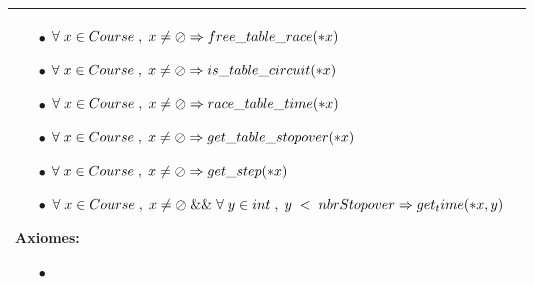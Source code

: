 \documentclass[a4paper, 11pt, oneside]{article}
\begin{document}
\begin{tabular}{|p{17cm}|c}
\begin{itemize}
						\item[$\bullet$] $\forall \hspace{1mm} x \in Course \hspace{1mm} , \hspace{1mm} x \neq \oslash \Rightarrow free\_table\_race(*x)$
						\item[$\bullet$] $\forall \hspace{1mm} x \in Course \hspace{1mm} , \hspace{1mm} x \neq \oslash \Rightarrow is\_table\_circuit(*x)$
						\item[$\bullet$] $\forall \hspace{1mm} x \in Course \hspace{1mm} , \hspace{1mm} x \neq \oslash \Rightarrow race\_table\_time(*x)$
						\item[$\bullet$] $\forall \hspace{1mm} x \in Course \hspace{1mm} , \hspace{1mm} x \neq \oslash \Rightarrow get\_table\_stopover(*x)$
						\item[$\bullet$] $\forall \hspace{1mm} x \in Course \hspace{1mm} , \hspace{1mm} x \neq \oslash \Rightarrow get\_step(*x)$
						\item[$\bullet$] $\forall \hspace{1mm} x \in Course \hspace{1mm} , \hspace{1mm} x \neq \oslash  \hspace{1mm} \&\& \hspace{1mm} \forall \hspace{1mm} y \in int \hspace{1mm} , \hspace{1mm} y \hspace{1mm} < \hspace{1mm} nbrStopover \Rightarrow get_time(*x, y)$
					\end{itemize}
					
				\textbf{Axiomes:}
					\begin{itemize}
						\item[$\bullet$]
					\end{itemize}
					
				\\	
				\hline
			\end{tabular}
		
\end{document}
